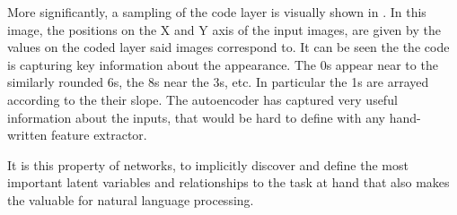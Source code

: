 \documentclass[12pt,parskip]{komatufte}\right
\begin{document}


More significantly, a sampling of the code layer is visually shown in .
In this image, the positions on the X and Y axis of the input images, are given by the values on the coded layer said images correspond to.
It can be seen the the code is capturing key information about the appearance.
The 0s appear near to the similarly rounded 6s,
the 8s near the 3s, etc.
In particular the 1s are arrayed according to the their slope.
The autoencoder has captured very useful information about the inputs, that would be hard to define with any hand-written feature extractor.

It is this property of networks, to implicitly discover and define the most important latent variables and relationships to the task at hand that also makes the valuable for natural language processing.
\end{document}
